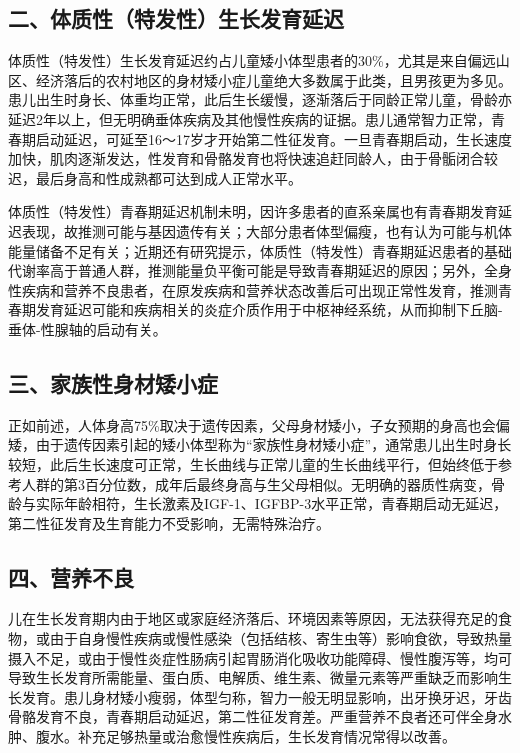 \subsection{二、体质性（特发性）生长发育延迟}

体质性（特发性）生长发育延迟约占儿童矮小体型患者的30\%，尤其是来自偏远山区、经济落后的农村地区的身材矮小症儿童绝大多数属于此类，且男孩更为多见。患儿出生时身长、体重均正常，此后生长缓慢，逐渐落后于同龄正常儿童，骨龄亦延迟2年以上，但无明确垂体疾病及其他慢性疾病的证据。患儿通常智力正常，青春期启动延迟，可延至16～17岁才开始第二性征发育。一旦青春期启动，生长速度加快，肌肉逐渐发达，性发育和骨骼发育也将快速追赶同龄人，由于骨骺闭合较迟，最后身高和性成熟都可达到成人正常水平。

体质性（特发性）青春期延迟机制未明，因许多患者的直系亲属也有青春期发育延迟表现，故推测可能与基因遗传有关；大部分患者体型偏瘦，也有认为可能与机体能量储备不足有关；近期还有研究提示，体质性（特发性）青春期延迟患者的基础代谢率高于普通人群，推测能量负平衡可能是导致青春期延迟的原因；另外，全身性疾病和营养不良患者，在原发疾病和营养状态改善后可出现正常性发育，推测青春期发育延迟可能和疾病相关的炎症介质作用于中枢神经系统，从而抑制下丘脑-垂体-性腺轴的启动有关。

\subsection{三、家族性身材矮小症}

正如前述，人体身高75\%取决于遗传因素，父母身材矮小，子女预期的身高也会偏矮，由于遗传因素引起的矮小体型称为“家族性身材矮小症”，通常患儿出生时身长较短，此后生长速度可正常，生长曲线与正常儿童的生长曲线平行，但始终低于参考人群的第3百分位数，成年后最终身高与生父母相似。无明确的器质性病变，骨龄与实际年龄相符，生长激素及IGF-1、IGFBP-3水平正常，青春期启动无延迟，第二性征发育及生育能力不受影响，无需特殊治疗。

\subsection{四、营养不良}

儿在生长发育期内由于地区或家庭经济落后、环境因素等原因，无法获得充足的食物，或由于自身慢性疾病或慢性感染（包括结核、寄生虫等）影响食欲，导致热量摄入不足，或由于慢性炎症性肠病引起胃肠消化吸收功能障碍、慢性腹泻等，均可导致生长发育所需能量、蛋白质、电解质、维生素、微量元素等严重缺乏而影响生长发育。患儿身材矮小瘦弱，体型匀称，智力一般无明显影响，出牙换牙迟，牙齿骨骼发育不良，青春期启动延迟，第二性征发育差。严重营养不良者还可伴全身水肿、腹水。补充足够热量或治愈慢性疾病后，生长发育情况常得以改善。

